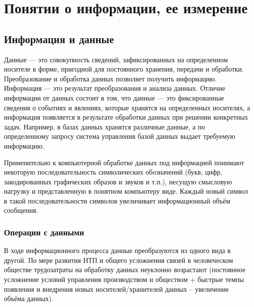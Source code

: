 \documentclass[a4paper]{article}
\begin{document}
\section{Понятии о информации, ее измерение}

\subsection{Информация и данные}

Данные --- это совокупность сведений, зафиксированных на определенном носителе в форме, пригодной для постоянного хранения, передачи и обработки. Преобразование и обработка данных позволяет получить информацию.\\
Информация --- это результат преобразования и анализа данных. Отличие информации от данных состоит в том, что данные --- это фиксированные сведения о событиях и явлениях, которые хранятся на определенных носителях, а информация появляется в результате обработки данных при решении конкретных задач. Например, в базах данных хранятся различные данные, а по определенному запросу система управления базой данных выдает требуемую информацию.

 Применительно к компьютерной обработке данных под информацией понимают некоторую последовательность символических обозначений (букв, цифр, закодированных графических образов и звуков и т.п.), несущую смысловую нагрузку и представленную в понятном компьютеру виде. Каждый новый символ в такой последовательности символов увеличивает информационный объём сообщения.

\subsubsection{Операции с данными}

В ходе информационного процесса данные преобразуются из одного вида в другой. По мере развития НТП и общего усложнения связей в человеческом обществе трудозатраты на обработку данных неуклонно возрастают (постоянное усложнение условий управления производством и обществом + быстрые темпы появления и внедрения новых носителей/хранителей данных – увеличение объёма данных).
\end{document}
